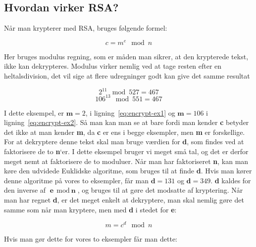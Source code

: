 \documentclass[a4paper,12pt]{extarticle}
\begin{document}
    \subsection{Hvordan virker RSA?}\label{subsec:hvordan-virker-rsa}
    Når man krypterer med RSA, bruges følgende formel:

    \begin{equation}
        c = m^e \mod n \label{eq:rsa-encrypt}
    \end{equation}

    Her bruges modulus regning, som er måden man sikrer, at den krypterede tekst, ikke kan dekrypteres.
    Modulus virker nemlig ved at tage resten efter en heltalsdivision,
    det vil sige at flere udregninger godt kan give det samme resultat

    \begin{equation}
        2^{11} \mod 527 = 467 \label{eq:encrypt-ex1}
    \end{equation}
    \begin{equation}
        106^{13} \mod 551 = 467 \label{eq:encrypt-ex2}
    \end{equation}

    I dette eksempel, er \(\textbf{m} = 2\), i ligning~\eqref{eq:encrypt-ex1} og \(\textbf{m} = 106\) i ligning~\eqref{eq:encrypt-ex2}.
    Så man kan man se at bare fordi man kender \textbf{c} betyder det ikke at man kender \textbf{m},
    da \textbf{c} er ens i begge eksempler, men \textbf{m} er forskellige.
    For at dekryptere denne tekst skal man bruge værdien for \textbf{d}, som findes ved at faktorisere de to \textbf{n}`er.
    I dette eksempel bruger vi meget små tal, og det er derfor meget nemt at faktorisere de to moduluer.
    Når man har faktoriseret \textbf{n}, kan man køre den udvidede Euklidske algoritme, som bruges til at finde \textbf{d}.
    Hvis man kører denne algoritme på vores to eksempler, får man \(\textbf{d} = 131\) og \(\textbf{d} = 349\).\@
    \textbf{d} kaldes for den inverse af \(\textbf{e} \mod \textbf{n}\), og bruges til at gøre det modsatte af kryptering.
    Når man har regnet \textbf{d}, er det meget enkelt at dekryptere, man skal nemlig gøre det samme som når man kryptere,
    men med \textbf{d} i stedet for \textbf{e}:

    \begin{equation}
        m = c^d \mod n \label{eq:rsa-decrypt}
    \end{equation}

    Hvis man gør dette for vores to eksempler får man dette:
\end{document}
